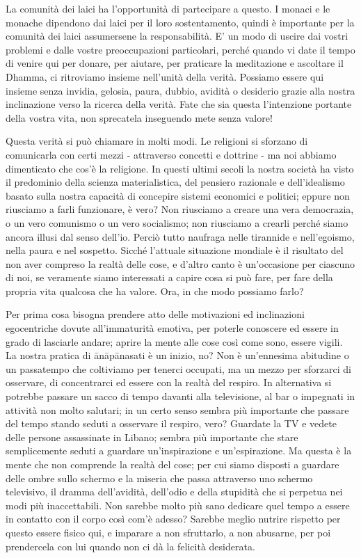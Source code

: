 La comunità dei laici ha l'opportunità di partecipare a questo. I monaci
e le monache dipendono dai laici per il loro sostentamento, quindi è
importante per la comunità dei laici assumersene la responsabilità. E'
un modo di uscire dai vostri problemi e dalle vostre preoccupazioni
particolari, perché quando vi date il tempo di venire qui per donare,
per aiutare, per praticare la meditazione e ascoltare il Dhamma, ci
ritroviamo insieme nell'unità della verità. Possiamo essere qui insieme
senza invidia, gelosia, paura, dubbio, avidità o desiderio grazie alla
nostra inclinazione verso la ricerca della verità. Fate che sia questa
l'intenzione portante della vostra vita, non sprecatela inseguendo mete
senza valore!

Questa verità si può chiamare in molti modi. Le religioni si sforzano di
comunicarla con certi mezzi - attraverso concetti e dottrine - ma noi
abbiamo dimenticato che cos'è la religione. In questi ultimi secoli la
nostra società ha visto il predominio della scienza materialistica, del
pensiero razionale e dell'idealismo basato sulla nostra capacità di
concepire sistemi economici e politici; eppure non riusciamo a farli
funzionare, è vero? Non riusciamo a creare una vera democrazia, o un
vero comunismo o un vero socialismo; non riusciamo a crearli perché
siamo ancora illusi dal senso dell'io. Perciò tutto naufraga nelle
tirannide e nell'egoismo, nella paura e nel sospetto. Sicché l'attuale
situazione mondiale è il risultato del non aver compreso la realtà delle
cose, e d'altro canto è un'occasione per ciascuno di noi, se veramente
siamo interessati a capire cosa si può fare, per fare della propria vita
qualcosa che ha valore. Ora, in che modo possiamo farlo?

Per prima cosa bisogna prendere atto delle motivazioni ed inclinazioni
egocentriche dovute all'immaturità emotiva, per poterle conoscere ed
essere in grado di lasciarle andare; aprire la mente alle cose così come
sono, essere vigili. La nostra pratica di ānāpānasati è un inizio, no?
Non è un'ennesima abitudine o un passatempo che coltiviamo per tenerci
occupati, ma un mezzo per sforzarci di osservare, di concentrarci ed
essere con la realtà del respiro. In alternativa si potrebbe passare un
sacco di tempo davanti alla televisione, al bar o impegnati in attività
non molto salutari; in un certo senso sembra più importante che passare
del tempo stando seduti a osservare il respiro, vero? Guardate la TV e
vedete delle persone assassinate in Libano; sembra più importante che
stare semplicemente seduti a guardare un'inspirazione e un'espirazione.
Ma questa è la mente che non comprende la realtà del cose; per cui siamo
disposti a guardare delle ombre sullo schermo e la miseria che passa
attraverso uno schermo televisivo, il dramma dell'avidità, dell'odio e
della stupidità che si perpetua nei modi più inaccettabili. Non sarebbe
molto più sano dedicare quel tempo a essere in contatto con il corpo
così com'è adesso? Sarebbe meglio nutrire rispetto per questo essere
fisico qui, e imparare a non sfruttarlo, a non abusarne, per poi
prendercela con lui quando non ci dà la felicità desiderata.

